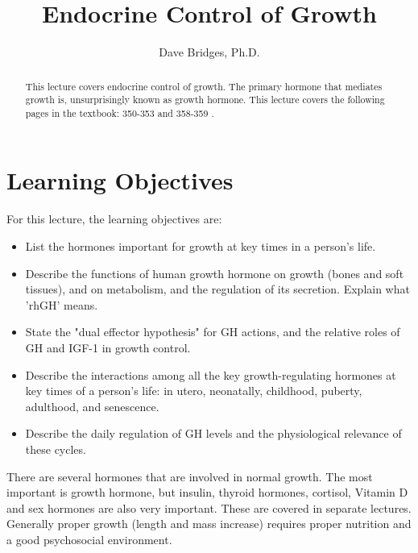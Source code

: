 \documentclass{tufte-handout}
\title{Endocrine Control of Growth}
\author{Dave Bridges, Ph.D.}
\begin{document}
\maketitle%

\begin{abstract}
\noindent This lecture covers endocrine control of growth.  The primary hormone that mediates growth is, unsurprisingly known as growth hormone.  This lecture covers the following pages in the textbook: 350-353 and 358-359 \cite{Widmaier2013}.
\end{abstract}

\tableofcontents

\pagebreak

\section{Learning Objectives}
For this lecture, the learning objectives are:
\begin{itemize}
\item List the hormones important for growth at key times in a person's life.
\item Describe the functions of human growth hormone on growth (bones and soft tissues), and on metabolism, and the regulation of its secretion.  Explain what 'rhGH' means.
\item State the "dual effector hypothesis" for GH actions, and the relative roles of GH and IGF-1 in growth control. 
\item Describe the interactions among all the key growth-regulating hormones at key times of a person's life: in utero, neonatally, childhood, puberty, adulthood, and senescence.
\item Describe the daily regulation of GH levels and the physiological relevance of these cycles.

\end{itemize}

\pagebreak

There are several hormones that are involved in normal growth.  The most important is growth hormone, but insulin, thyroid hormones, cortisol, Vitamin D and sex hormones are also very important.  These are covered in separate lectures.  Generally proper growth (length and mass increase) requires proper nutrition and a good psychosocial environment.   
\end{document}
